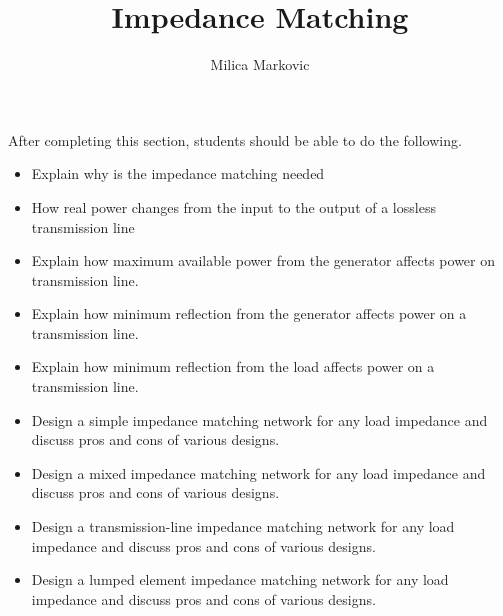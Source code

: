 \documentclass{ximera}
\title{Impedance Matching}
\author{Milica Markovic}
\begin{document}
\begin{abstract}
\end{abstract}

\maketitle

\begin{sectionOutcomes}

After completing this section, students should be able to do the following.

\begin{itemize}
\item Explain why is the impedance matching needed
\item How real power changes from the input to the output of a lossless transmission line
\item Explain how maximum available power from the generator affects power on transmission line.
\item Explain how minimum reflection from the generator affects power on a transmission line.
\item Explain how minimum reflection from the load affects power on a transmission line.
\item Design a simple impedance matching network for any load impedance and discuss pros and cons of various designs.
\item Design a mixed impedance matching network for any load impedance and discuss pros and cons of various designs.
\item Design a transmission-line impedance matching network for any load impedance and discuss pros and cons of various designs.
\item Design a lumped element impedance matching network for any load impedance and discuss pros and cons of various designs.

\end{itemize}

\end{sectionOutcomes}
\end{document}
